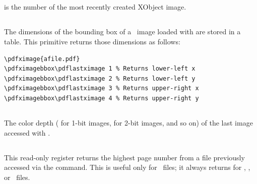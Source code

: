 \documentclass{pdftexmanual}
\begin{document}
\subsection{}

\type{\pdflastximage} is the number of the most recently created XObject
image.

\subsection{}

The dimensions of the bounding box of a \PDF\ image loaded with
 are stored in a table. This primitive returns those
dimensions as follows:

\begin{verbatim}
\pdfximage{afile.pdf}
\pdfximagebbox\pdflastximage 1 % Returns lower-left x
\pdfximagebbox\pdflastximage 2 % Returns lower-left y
\pdfximagebbox\pdflastximage 3 % Returns upper-right x
\pdfximagebbox\pdflastximage 4 % Returns upper-right y
\end{verbatim}

\subsection{}

The color depth ( for 1-bit images,  for 2-bit images,
and so on) of the last image accessed with .

\subsection{}

This read-only register returns the highest page number from a file
previously accessed via the  command.
This is useful only for \PDF\ files; it always returns 
for \PNG, \JPEG, or \JBIGTWO\ files.

\subsection{}
\end{document}
